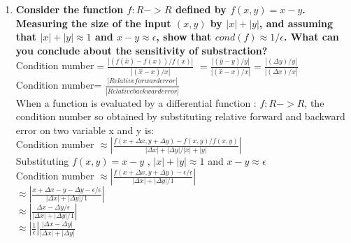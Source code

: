 \documentclass[12pt, oneside]{article}   	%
\begin{document}
\begin{enumerate}
\begin{enumerate}
      \end{enumerate}
  
  \hspace{3cm}
    	\item \textbf{Consider the function $f:R -> R$ defined by $f(x,y)= x-y$. Measuring the size of the input $(x,y)$ by $|x| + |y|$, and assuming that $|x| + |y| \approx 1 $ and $x-y \approx \epsilon$, show that $cond(f) \approx 1/ \epsilon$. What can you conclude about the sensitivity of substraction?}\\
    	
    	
    	
    	Condition number$= \frac{|(f(\hat {x})- f(x))/ f(x)| }{|(\hat{x }-x )/x|}$ $= \frac{|(\hat{y}- y)/ y| }{|(\hat {x} -x )/x|}$$= \frac{|(\Delta y)/ y| }{|(\Delta x )/x|}$ \\
    	
    	Condition number= $\frac{ |Relative forward error| }{|Relative backward error|}$\\
    	
    	When a function is evaluated by a differential function : $ f:R ->R$, the condition number so obtained by substituting relative forward and backward error on two variable x and y  is:\\
    	
    	Condition number $\approx |\frac{f(x + \Delta x, y + \Delta y) - f(x,y) / f(x,y)} { |\Delta x| + | \Delta y|/|x| + |y|}|$\\
    	
    	Substituting $f(x,y)= x-y$ , $|x| + |y| \approx 1 $ and $x-y \approx \epsilon$\\
    	
    	Condition number $\approx |\frac{f(x + \Delta x, y + \Delta y) - \epsilon / \epsilon} { |\Delta x| + | \Delta y|/1}|$\\
    	
    \hspace{3cm}	$\approx |\frac{x + \Delta x -y - \Delta y - \epsilon / \epsilon} { |\Delta x| + | \Delta y|/1}|$\\
    	
     \hspace{3cm}	$\approx |\frac{ \Delta x  - \Delta y  / \epsilon} { |\Delta x| + | \Delta y|/1}|$\\
     
       \hspace{3cm}	$\approx |\frac{1}{\epsilon}|\frac{ |\Delta x  - \Delta y| } { |\Delta x| + | \Delta y|}$\\
       

\end{enumerate}
\end{document}
